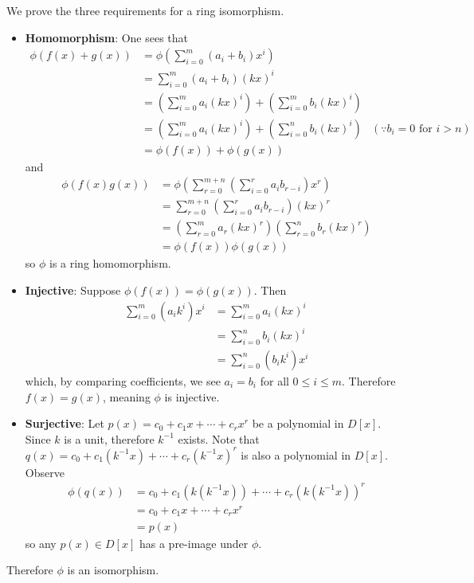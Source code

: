 \begin{questions}
    \item We prove the three requirements for a ring isomorphism.
    \begin{itemize}
        \item \textbf{Homomorphism}: One sees that
        \begin{align*}
            \phi(f(x) + g(x)) &= \phi\left(\sum_{i=0}^m(a_i+b_i)x^i\right)\\
            &= \sum_{i=0}^m(a_i+b_i)(kx)^i\\
            &= \left(\sum_{i=0}^ma_i(kx)^i\right) + \left(\sum_{i=0}^mb_i(kx)^i\right)\\
            &= \left(\sum_{i=0}^ma_i(kx)^i\right) + \left(\sum_{i=0}^nb_i(kx)^i\right) & (\because b_i = 0 \text{ for } i > n)\\
            &= \phi(f(x)) + \phi(g(x))
        \end{align*}
        and
        \begin{align*}
            \phi(f(x)g(x)) &= \phi\left(\sum_{r=0}^{m+n}\left(\sum_{i=0}^ra_ib_{r-i}\right)x^r\right)\\
            &= \sum_{r=0}^{m+n}\left(\sum_{i=0}^ra_ib_{r-i}\right)(kx)^r\\
            &= \left(\sum_{r=0}^ma_r(kx)^r\right)\left(\sum_{r=0}^nb_r(kx)^r\right)\\
            &= \phi(f(x))\phi(g(x))
        \end{align*}
        so $\phi$ is a ring homomorphism.

        \item \textbf{Injective}: Suppose $\phi(f(x)) = \phi(g(x))$. Then
        \begin{align*}
            \sum_{i=0}^m(a_ik^i)x^i &= \sum_{i=0}^ma_i(kx)^i\\
            &= \sum_{i=0}^nb_i(kx)^i\\
            &= \sum_{i=0}^n(b_ik^i)x^i
        \end{align*}
        which, by comparing coefficients, we see $a_i = b_i$ for all $0 \leq i \leq m$. Therefore $f(x) = g(x)$, meaning $\phi$ is injective.

        \item \textbf{Surjective}: Let $p(x) = c_0 + c_1x + \cdots + c_rx^r$ be a polynomial in $D[x]$. Since $k$ is a unit, therefore $k^{-1}$ exists. Note that $q(x) = c_0 + c_1(k^{-1}x) + \cdots + c_r(k^{-1}x)^r$ is also a polynomial in $D[x]$. Observe
        \begin{align*}
            \phi(q(x)) &= c_0 + c_1(k(k^{-1}x)) + \cdots + c_r(k(k^{-1}x))^r\\
            &= c_0 + c_1x + \cdots + c_rx^r\\
            &= p(x)
        \end{align*}
        so any $p(x) \in D[x]$ has a pre-image under $\phi$.
    \end{itemize}
    Therefore $\phi$ is an isomorphism.


\end{questions}
